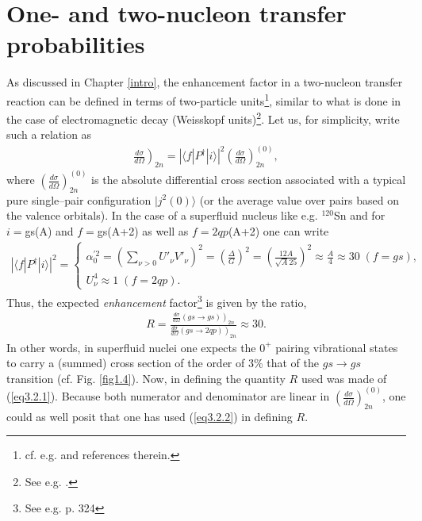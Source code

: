 \section[Transfer probabilities, enhancement factor]{One- and two-nucleon transfer probabilities}\label{C3S2}
As discussed in Chapter \ref{intro}, the enhancement factor in a two-nucleon transfer reaction can be defined in terms of two-particle units\footnote{cf. e.g. \cite{Broglia:72b,Broglia:73} and references therein.}, similar to what is done in the case of electromagnetic decay (Weisskopf units)\footnote{See e.g. \cite{Bohr:69}.}. Let us, for simplicity, write such a relation as
\begin{align}\label{eq3.2.1}
\left.\frac{d\sigma}{d\Omega}\right)_{2n}=\left|\langle f|P^\dagger|i\rangle \right|^2\left(\frac{d\sigma}{d\Omega}\right)^{(0)}_{2n},
\end{align} 
where $\left(\frac{d\sigma}{d\Omega}\right)^{(0)}_{2n}$ is the absolute differential cross section associated with a typical pure single--pair configuration $|j^2(0)\rangle$ (or the average value over pairs based on the valence orbitals).  In the case of a superfluid nucleus like e.g. $^{120}$Sn and for $i=$gs(A) and $f=$gs(A+2) as well as $f=2qp$(A+2) one can write 
\begin{align}\label{eq3.2.2}
\left|\langle f|P^\dagger|i\rangle \right|^2=\left\{\begin{array}{l}
 \alpha_0^{'2}=\left(\sum_{\nu>0}U'_{\nu}V'_{\nu}\right)^2=\left(\frac{\Delta}{G}\right)^2=\left(\frac{12A}{\sqrt{A}25}\right)^2\approx\frac{A}{4}\approx 30\; (f=gs),\\
 U_\nu^4\approx 1\; (f=2qp).
\end{array} \right.
\end{align} 
Thus, the expected \textit{enhancement} factor\footnote{See e.g. \cite{Brink:05} p. 324} is given by the ratio, 
\begin{align}\label{eq3.2.3}
R=\frac{\left.\frac{d\sigma}{d\Omega}(gs\rightarrow gs)\right)_{2n}}{\left.\frac{d\sigma}{d\Omega}(gs\rightarrow 2qp)\right)_{2n}}\approx 30.
\end{align}
In other words, in superfluid nuclei one expects the $0^+$ pairing vibrational states to carry a (summed) cross section of the order of 3\% that of the $gs\rightarrow gs$ transition (cf. Fig. \ref{fig1.4}).
Now, in defining the quantity $R$ used was made of (\ref{eq3.2.1}). Because both numerator and denominator are linear in $\left(\frac{d\sigma}{d\Omega}\right)_{2n}^{(0)}$, one could as well posit that one has used (\ref{eq3.2.2}) in defining $R$.


